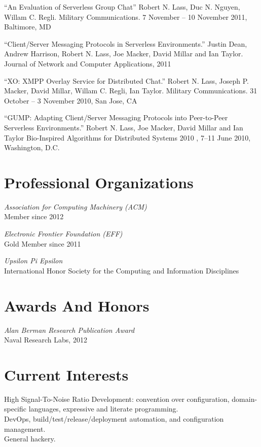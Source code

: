 \documentclass[margin]{res}
\begin{document}
\begin{resume}
  ``An Evaluation of Serverless Group Chat'' Robert N. Lass, Duc N. Nguyen,  Willam C. Regli. Military Communications. 7 November -- 10 November 2011, Baltimore, MD

  ``Client/Server Messaging Protocols in Serverless Environments.'' Justin Dean, Andrew Harrison, Robert N. Lass, Joe Macker, David Millar and Ian Taylor. Journal of Network and Computer Applications, 2011

  ``XO: XMPP Overlay Service for Distributed Chat.'' Robert N. Lass, Joseph P. Macker, David Millar, Willam C. Regli, Ian Taylor. Military Communications. 31 October -- 3 November 2010, San Jose, CA

  ``GUMP: Adapting Client/Server Messaging Protocols into Peer-to-Peer Serverless Environments.'' Robert N. Lass, Joe Macker, David Millar and Ian Taylor Bio-Inspired Algorithms for Distributed Systems 2010 , 7--11 June 2010, Washington, D.C.

\section{Professional Organizations}
  {\it Association for Computing Machinery (ACM)} \\
  Member since 2012

  {\it Electronic Frontier Foundation (EFF)} \\
  Gold Member since 2011

  {\it Upsilon Pi Epsilon} \\
  International Honor Society for the Computing and Information Disciplines

\section{Awards And Honors}
  {\it Alan Berman Research Publication Award} \\
  Naval Research Labs, 2012

\section{Current Interests}
  High Signal-To-Noise Ratio Development: convention over configuration, domain-specific languages, expressive and literate programming. \\
  DevOps, build/test/release/deployment automation, and configuration management. \\
  General hackery.

\end{resume}
\end{document}
